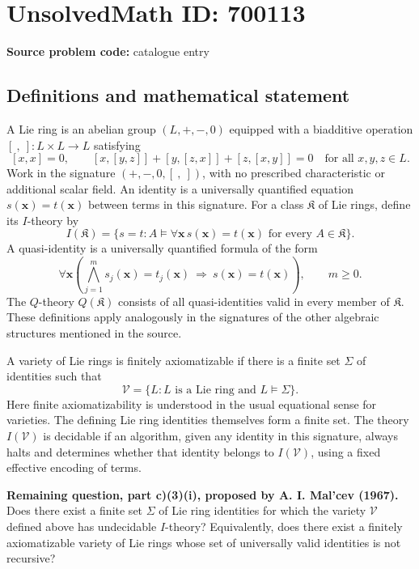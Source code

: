 \documentclass[11pt]{article}
\begin{document}
\section*{UnsolvedMath ID: 700113}
\textbf{Source problem code:} catalogue entry
\subsection{Definitions and mathematical statement}
A Lie ring is an abelian group \((L,+,-,0)\) equipped with a biadditive operation \([\ ,\ ]:L\times L\to L\) satisfying
\[
[x,x]=0,\qquad [x,[y,z]]+[y,[z,x]]+[z,[x,y]]=0
\quad\text{for all }x,y,z\in L.
\]
Work in the signature \((+,-,0,[\ ,\ ])\), with no prescribed characteristic or additional scalar field. An identity is a universally quantified equation \(s(\mathbf{x})=t(\mathbf{x})\) between terms in this signature. For a class \(\mathfrak K\) of Lie rings, define its \(I\)-theory by
\[
I(\mathfrak K)=\{s=t: A\models\forall\mathbf{x}\,s(\mathbf{x})=t(\mathbf{x})\text{ for every }A\in\mathfrak K\}.
\]
A quasi-identity is a universally quantified formula of the form
\[
\forall\mathbf{x}\left(\bigwedge_{j=1}^{m}s_j(\mathbf{x})=t_j(\mathbf{x})\ \Longrightarrow\ s(\mathbf{x})=t(\mathbf{x})\right),
\qquad m\geq 0.
\]
The \(Q\)-theory \(Q(\mathfrak K)\) consists of all quasi-identities valid in every member of \(\mathfrak K\). These definitions apply analogously in the signatures of the other algebraic structures mentioned in the source.

A variety of Lie rings is finitely axiomatizable if there is a finite set \(\Sigma\) of identities such that
\[
\mathcal V=\{L:L\text{ is a Lie ring and }L\models\Sigma\}.
\]
Here finite axiomatizability is understood in the usual equational sense for varieties. The defining Lie ring identities themselves form a finite set. The theory \(I(\mathcal V)\) is decidable if an algorithm, given any identity in this signature, always halts and determines whether that identity belongs to \(I(\mathcal V)\), using a fixed effective encoding of terms.

\textbf{Remaining question, part c)(3)(i), proposed by A. I. Mal'cev (1967).} Does there exist a finite set \(\Sigma\) of Lie ring identities for which the variety \(\mathcal V\) defined above has undecidable \(I\)-theory? Equivalently, does there exist a finitely axiomatizable variety of Lie rings whose set of universally valid identities is not recursive?
\end{document}

